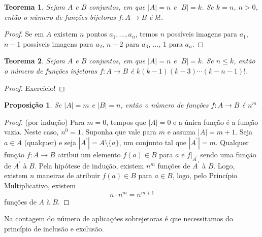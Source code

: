 \documentclass[]{book}
\newtheorem{theorem}{Teorema}[chapter]
\newtheorem{proposition}{Proposição}[chapter]
\theoremstyle{definition}
\theoremstyle{definition}
\theoremstyle{definition}
\theoremstyle{remark}
\begin{document}
\begin{theorem}
\protect\hypertarget{thm:teoFuncoesBijetoras}{}{\label{thm:teoFuncoesBijetoras} }Sejam \(A\) e \(B\) conjuntos, em que \(|A|=n\) e \(|B|=k\).
Se \(k=n\), \(n>0\), então o número de funções bijetoras \(f:A\rightarrow B\) é \(k!\).
\end{theorem}

\begin{proof}
\iffalse{} {Prova. } \fi{}Se em \(A\) existem \(n\) pontos \(a_1, \ldots, a_n\), temos \(n\) possíveis imagens para \(a_1\), \(n-1\) possíveis imagens para \(a_2\), \(n-2\) para \(a_3\), \(\ldots\), 1 para \(a_n\).
\end{proof}

\begin{theorem}
\protect\hypertarget{thm:teoFuncoesInjetoras}{}{\label{thm:teoFuncoesInjetoras} }Sejam \(A\) e \(B\) conjuntos, em que \(|A|=n\) e \(|B|=k\).
Se \(n\leq k\), então o número de funções injetoras \(f:A\rightarrow B\) é \(k(k-1)(k-3)\cdots(k-n-1)!\).
\end{theorem}

\begin{proof}
\iffalse{} {Prova. } \fi{}Exercício!
\end{proof}

\begin{proposition}
\protect\hypertarget{prp:unnamed-chunk-108}{}{\label{prp:unnamed-chunk-108} }Se \(|A|=m\) e \(|B|=n\), então o número de funções \(f:A\rightarrow B\) é \(n^m\)
\end{proposition}

\begin{proof}
\iffalse{} {Prova. } \fi{}(por indução)
Para \(m=0\), tempos que \(|A|=0\) e a única função é a função vazia.
Neste caso, \(n^0=1\).
Suponha que vale para \(m\) e assuma \(|A|=m+1\).
Seja \(a \in A\) (qualquer) e seja \(|A^\prime|=A\setminus\{a\}\), um conjunto tal que \(|A^\prime|=m\).
Qualquer função \(f:A\rightarrow B\) atribui um elemento \(f(a)\in B\) para \(a\) e \(f|_{A^\prime}\) sendo uma função de \(A^\prime\) à \(B\).
Pela hipótese de indução, existem \(n^m\) funções de \(A^\prime\) à \(B\).
Logo, existem \(n\) maneiras de atribuir \(f(a)\in B\) para \(a \in B\), logo, pelo Princípio Multiplicativo, existem
\[n\cdot n^m = n^{m+1}\]
funções de \(A\) à \(B\).
\end{proof}

Na contagem do número de aplicações sobrejetoras é que necessitamos do princípio de inclusão e exclusão.
\end{document}
